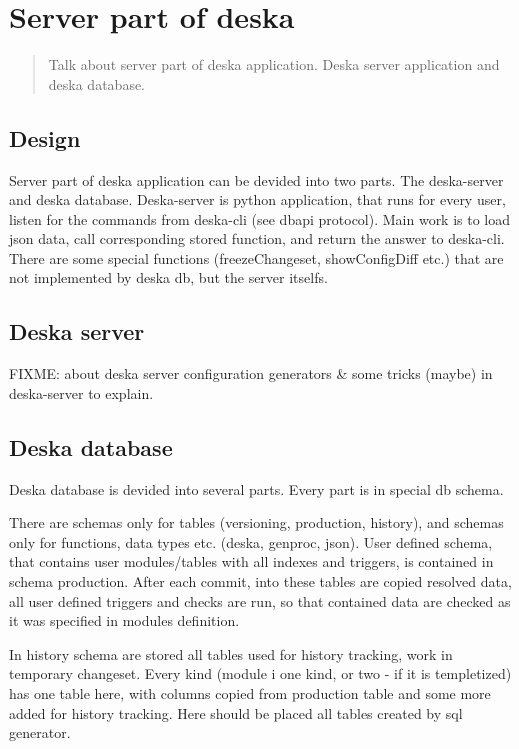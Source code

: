 \documentclass[deska]{subfiles}
\begin{document}
\chapter{Server part of deska}
\label{sec:deska-server}

\begin{abstract}
Talk about server part of deska application. Deska server application and deska database.
\end{abstract}

\section{Design}
Server part of deska application can be devided into two parts. The deska-server and deska database.
Deska-server is python application, that runs for every user, listen for the commands from deska-cli (see dbapi protocol).
Main work is to load json data, call corresponding stored function, and return the answer to deska-cli.
There are some special functions (freezeChangeset, showConfigDiff etc.) that are not implemented by deska db, but the server itselfs.

\section{Deska server}
FIXME: about deska server configuration generators & some tricks (maybe) in deska-server to explain.

\section{Deska database}
Deska database is devided into several parts. Every part is in special db schema. 

There are schemas only for tables (versioning, production, history), and schemas only for functions, data types etc. (deska, genproc, json).
User defined schema, that contains user modules/tables with all indexes and triggers, is contained in schema production. After each commit, into these tables are copied resolved data, all user defined triggers and checks are run, so that contained data are checked as it was specified in modules definition.

In history schema are stored all tables used for history tracking, work in temporary changeset. Every kind (module i one kind, or two - if it is templetized) has one table here, with columns copied from production table and some more added for history tracking. Here should be placed all tables created by sql generator.
\end{document}
